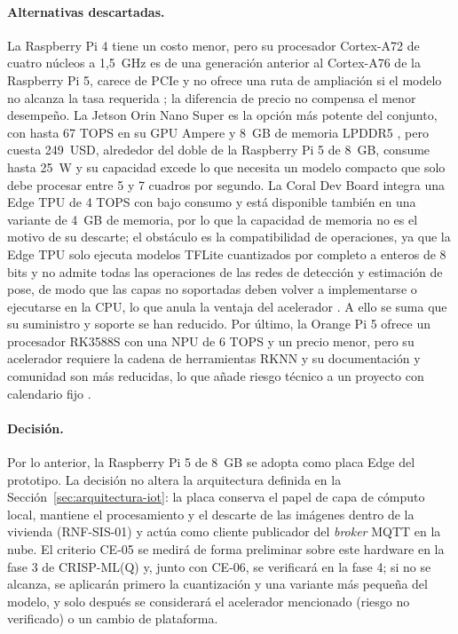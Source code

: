 \documentclass[12pt,a4paper,oneside]{book}
\theoremstyle{plain}
\theoremstyle{definition}
\theoremstyle{remark}
\begin{document}
\paragraph{Alternativas descartadas.} La Raspberry Pi 4 tiene un costo menor, pero su procesador Cortex-A72 de cuatro núcleos a 1,5~GHz es de una generación anterior al Cortex-A76 de la Raspberry Pi 5, carece de PCIe y no ofrece una ruta de ampliación si el modelo no alcanza la tasa requerida \parencite{raspberrypi2026pi4}; la diferencia de precio no compensa el menor desempeño. La Jetson Orin Nano Super es la opción más potente del conjunto, con hasta 67 TOPS en su GPU Ampere y 8~GB de memoria LPDDR5 \parencite{nvidia2026jetson}, pero cuesta 249~USD, alrededor del doble de la Raspberry Pi 5 de 8~GB, consume hasta 25~W y su capacidad excede lo que necesita un modelo compacto que solo debe procesar entre 5 y 7 cuadros por segundo. La Coral Dev Board integra una Edge TPU de 4 TOPS con bajo consumo y está disponible también en una variante de 4~GB de memoria, por lo que la capacidad de memoria no es el motivo de su descarte; el obstáculo es la compatibilidad de operaciones, ya que la Edge TPU solo ejecuta modelos TFLite cuantizados por completo a enteros de 8 bits y no admite todas las operaciones de las redes de detección y estimación de pose, de modo que las capas no soportadas deben volver a implementarse o ejecutarse en la CPU, lo que anula la ventaja del acelerador \parencite{coral2026devboard}. A ello se suma que su suministro y soporte se han reducido. Por último, la Orange Pi 5 ofrece un procesador RK3588S con una NPU de 6 TOPS y un precio menor, pero su acelerador requiere la cadena de herramientas RKNN y su documentación y comunidad son más reducidas, lo que añade riesgo técnico a un proyecto con calendario fijo \parencite{orangepi2026pi5}.

\paragraph{Decisión.} Por lo anterior, la Raspberry Pi 5 de 8~GB se adopta como placa Edge del prototipo. La decisión no altera la arquitectura definida en la Sección~\ref{sec:arquitectura-iot}: la placa conserva el papel de capa de cómputo local, mantiene el procesamiento y el descarte de las imágenes dentro de la vivienda (RNF-SIS-01) y actúa como cliente publicador del \textit{broker} MQTT en la nube. El criterio CE-05 se medirá de forma preliminar sobre este hardware en la fase 3 de CRISP-ML(Q) y, junto con CE-06, se verificará en la fase 4; si no se alcanza, se aplicarán primero la cuantización y una variante más pequeña del modelo, y solo después se considerará el acelerador mencionado (riesgo no verificado) o un cambio de plataforma.
\end{document}
